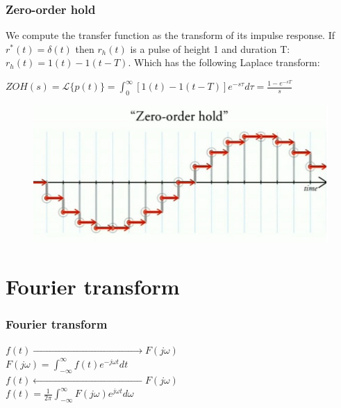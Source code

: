\begin{frame}
	\frametitle{Zero-order hold}
	We compute the transfer function as the transform of its impulse response. If $r^*(t)=\delta(t)$ then $r_h(t)$ is a pulse of height 1 and duration T: $r_h(t) = 1(t) - 1(t-T)$. Which has the following Laplace transform:\\
	\vspace{-0.5em}
	\begin{center}
		$ZOH(s)=\mathcal{L}\{p(t)\} = \int_{0}^{\infty} [1(t)-1(t-T)]e^{-s\tau}d\tau = \frac{1-e^{-sT}}{s}$
	\end{center}
	\vspace{-1.3em}
	\begin{figure}
		\includegraphics[width=0.6\linewidth]{zoh}
	\end{figure}
\end{frame}

\section{Fourier transform}

\begin{frame}
	\frametitle{Fourier transform}
	\begin{center}
		\Large{
		$f(t)\xrightarrow{\qquad \qquad \qquad \qquad \qquad \qquad \qquad \qquad}F(j\omega)$\\
		$F(j\omega) = \int_{-\infty}^{\infty} f(t)e^{-j\omega t} dt$\\
		\bigskip
		$f(t)\xleftarrow{\qquad \qquad \qquad \qquad \qquad \qquad \qquad \qquad}F(j\omega)$\\
		$f(t) = \frac{1}{2\pi} \int_{-\infty}^{\infty} F(j\omega) e^{j\omega t} d\omega$}
	\end{center}
\end{frame}

